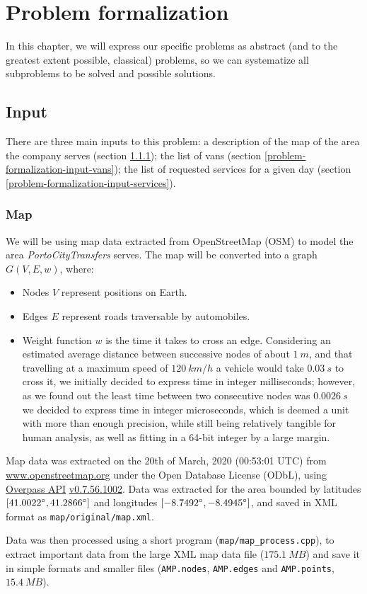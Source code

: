 \chapter{Problem formalization} \label{problem-formalization}
In this chapter, we will express our specific problems as abstract (and to the greatest extent possible, classical) problems, so we can systematize all subproblems to be solved and possible solutions.
\section{Input} \label{problem-formalization-input}
There are three main inputs to this problem: a description of the map of the area the company serves (section \ref{problem-formalization-input-map}); the list of vans (section \ref{problem-formalization-input-vans}); the list of requested services for a given day (section \ref{problem-formalization-input-services}).
\subsection{Map} \label{problem-formalization-input-map}
We will be using map data extracted from OpenStreetMap (OSM) to model the area \emph{PortoCityTransfers} serves.
The map will be converted into a graph $G(V,E, w)$, where:
\begin{itemize}
    \item Nodes $V$ represent positions on Earth.
    \item Edges $E$ represent roads traversable by automobiles.
    \item Weight function $w$ is the time it takes to cross an edge. Considering an estimated average distance between successive nodes of about $\SI{1}{m}$, and that travelling at a maximum speed of $\SI{120}{km/h}$ a vehicle would take $\SI{0.03}{s}$ to cross it, we initially decided to express time in integer milliseconds; however, as we found out the least time between two consecutive nodes was $\SI{0.0026}{s}$ we decided to express time in integer microseconds, which is deemed a unit with more than enough precision, while still being relatively tangible for human analysis, as well as fitting in a 64-bit integer by a large margin.
\end{itemize}
Map data was extracted on the 20th of March, 2020 (00:53:01 UTC) from \url{www.openstreetmap.org} under the Open Database License (ODbL), using \href{https://wiki.openstreetmap.org/wiki/Overpass_API}{Overpass API} \href{https://wiki.openstreetmap.org/wiki/Overpass_API/versions#Overpass_API_v0.7.56}{v0.7.56.1002}. Data was extracted for the area bounded by latitudes $[41.0022 ^{\circ}, 41.2866 ^{\circ}]$ and longitudes $[-8.7492 ^{\circ}, -8.4945 ^{\circ}]$, and saved in XML format as \texttt{map/original/map.xml}.\par
Data was then processed using a short program (\texttt{map/map\_process.cpp}), to extract important data from the large XML map data file ($\SI{175.1}{MB}$) and save it in simple formats and smaller files (\texttt{AMP.nodes}, \texttt{AMP.edges} and \texttt{AMP.points}, $\SI{15.4}{MB}$).

